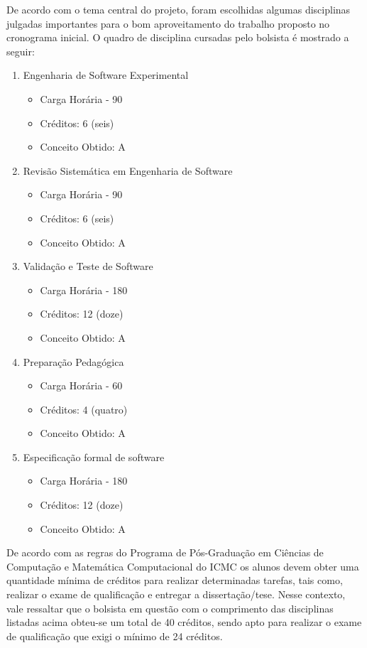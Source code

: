 
De acordo com o tema central do projeto, foram escolhidas algumas disciplinas julgadas importantes para o bom aproveitamento do trabalho proposto no cronograma inicial. O quadro de disciplina cursadas pelo bolsista é mostrado a seguir:

\begin{enumerate}
	\item Engenharia de Software Experimental
		\begin{itemize}
			\item Carga Horária - 90
			\item Créditos: 6 (seis)
			\item Conceito Obtido: A
		\end{itemize}
	\item Revisão Sistemática em Engenharia de Software
		\begin{itemize}
			\item Carga Horária - 90
			\item Créditos: 6 (seis)
			\item Conceito Obtido: A
		\end{itemize}
	\item Validação e Teste de Software
		\begin{itemize}
			\item Carga Horária - 180
			\item Créditos: 12 (doze)
			\item Conceito Obtido: A
		\end{itemize}
	\item Preparação Pedagógica
		\begin{itemize}
			\item Carga Horária - 60
			\item Créditos: 4 (quatro)
			\item Conceito Obtido: A 
		\end{itemize}
	\item Especificação formal de software
		\begin{itemize}
			\item Carga Horária - 180
			\item Créditos: 12 (doze)
			\item Conceito Obtido: A
		\end{itemize}
\end{enumerate}

De acordo com as regras do Programa de Pós-Graduação em Ciências de Computação e Matemática Computacional do ICMC os alunos devem obter uma quantidade mínima de créditos para realizar determinadas tarefas, tais como, realizar o exame de qualificação e entregar a dissertação/tese. Nesse contexto, vale ressaltar que o bolsista em questão com o comprimento das disciplinas listadas acima obteu-se um total de 40 créditos, sendo apto para realizar o exame de qualificação que exigi o mínimo de 24 créditos.%


